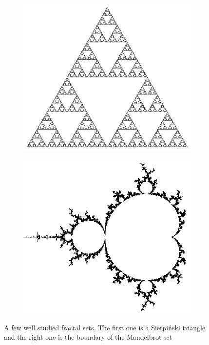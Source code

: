 \begin{figure}[h]
\begin{subfigure}{.5\textwidth}
  \centering
  \includegraphics[width=.8\linewidth]{pics/intro/sierpinski.png}
  \label{fig:sfig1}
\end{subfigure}%
\begin{subfigure}{.5\textwidth}
  \centering
  \includegraphics[width=.8\linewidth]{pics/intro/Boundary_mandelbrot_set.png}
  \label{fig:sfig2}
\end{subfigure}
\caption{A few well studied fractal sets. The first one is a Sierpi\'nski triangle and the right one is the boundary of the Mandelbrot set}
\label{fig:examples1}
\end{figure}



